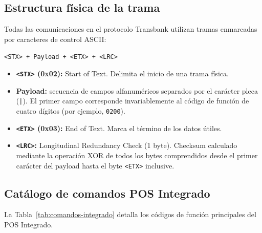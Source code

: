 \documentclass{../../plantilla/raysac-informe}
\begin{document}
\subsection{Estructura física de la trama}
Todas las comunicaciones en el protocolo Transbank utilizan tramas enmarcadas por caracteres de control ASCII:
\begin{center}
\texttt{<STX> + Payload + <ETX> + <LRC>}
\end{center}
\begin{itemize}
  \item \textbf{\texttt{<STX>} (0x02):} Start of Text. Delimita el inicio de una trama física.
  \item \textbf{Payload:} secuencia de campos alfanuméricos separados por el carácter pleca (\texttt{|}).
    El primer campo corresponde invariablemente al código de función de cuatro dígitos (por ejemplo, \texttt{0200}).
  \item \textbf{\texttt{<ETX>} (0x03):} End of Text. Marca el término de los datos útiles.
  \item \textbf{\texttt{<LRC>}:} Longitudinal Redundancy Check (1 byte). Checksum calculado mediante la operación
    XOR de todos los bytes comprendidos desde el primer carácter del payload hasta el byte \texttt{<ETX>} inclusive.
\end{itemize}

\subsection{Catálogo de comandos POS Integrado}
La Tabla~\ref{tab:comandos-integrado} detalla los códigos de función principales del POS Integrado.
\end{document}

